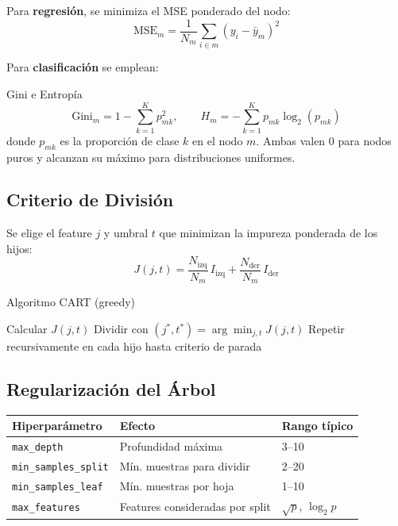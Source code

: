 \documentclass[12pt, a4paper]{article}
\begin{document}
Para \textbf{regresión}, se minimiza el MSE ponderado del nodo:
\[
  \text{MSE}_m = \frac{1}{N_m}\sum_{i \in m}(y_i - \bar{y}_m)^2
\]

Para \textbf{clasificación} se emplean:
\begin{defbox}{Gini e Entropía}
\[
  \text{Gini}_m = 1 - \sum_{k=1}^{K} p_{mk}^2, \qquad
  H_m = -\sum_{k=1}^{K} p_{mk}\log_2(p_{mk})
\]
donde $p_{mk}$ es la proporción de clase $k$ en el nodo $m$.
Ambas valen 0 para nodos puros y alcanzan su máximo para distribuciones uniformes.
\end{defbox}

\subsection{Criterio de División}

Se elige el feature $j$ y umbral $t$ que minimizan la impureza ponderada de los hijos:
\[
  J(j, t) = \frac{N_{\text{izq}}}{N_m}\,I_{\text{izq}} + \frac{N_{\text{der}}}{N_m}\,I_{\text{der}}
\]

\begin{algbox}{Algoritmo CART (greedy)}
\begin{algorithmic}[1]
    \State Calcular $J(j,t)$
  \EndFor
  \State Dividir con $(j^*, t^*) = \arg\min_{j,t} J(j,t)$
  \State Repetir recursivamente en cada hijo hasta criterio de parada
\end{algorithmic}
\end{algbox}

\subsection{Regularización del Árbol}

\begin{center}
\begin{tabular}{lll}
\toprule
\textbf{Hiperparámetro} & \textbf{Efecto} & \textbf{Rango típico} \\
\midrule
\texttt{max\_depth} & Profundidad máxima & 3–10 \\
\texttt{min\_samples\_split} & Mín. muestras para dividir & 2–20 \\
\texttt{min\_samples\_leaf} & Mín. muestras por hoja & 1–10 \\
\texttt{max\_features} & Features consideradas por split & $\sqrt{p}$, $\log_2 p$ \\
\bottomrule
\end{tabular}
\end{center}
\end{document}
